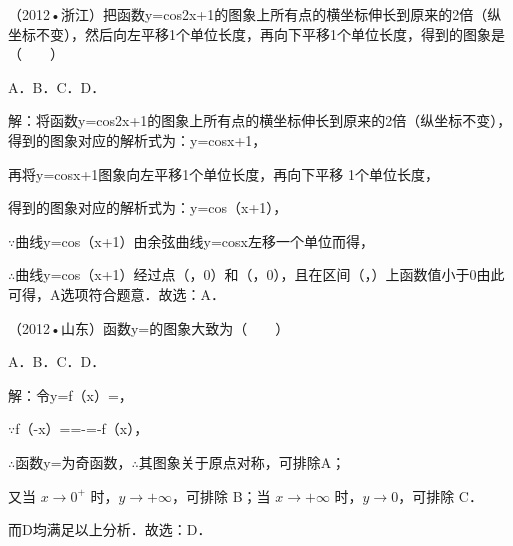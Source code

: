 \begin{question}
（2012•浙江）把函数y=cos2x+1的图象上所有点的横坐标伸长到原来的2倍（纵坐标不变），然后向左平移1个单位长度，再向下平移1个单位长度，得到的图象是（　　）\par
A．\qquad{}B．\qquad{}C．\qquad{}D．\par
\begin{solution}
解：将函数y=cos2x+1的图象上所有点的横坐标伸长到原来的2倍（纵坐标不变），得到的图象对应的解析式为：y=cosx+1，\par
再将y=cosx+1图象向左平移1个单位长度，再向下平移 1个单位长度，\par
得到的图象对应的解析式为：y=cos（x+1），\par
\ensuremath{\because}曲线y=cos（x+1）由余弦曲线y=cosx左移一个单位而得，\par
\ensuremath{\therefore}曲线y=cos（x+1）经过点（，0）和（，0），且在区间（，）上函数值小于0由此可得，A选项符合题意．故选：A．\par
\end{solution}
\end{question}

\begin{question}
（2012•山东）函数y=的图象大致为（　　）\par
A．\qquad{}B．\qquad{}C．\qquad{}D．\par
\begin{solution}
解：令y=f（x）=，\par
\ensuremath{\because}f（-x）==-=-f（x），\par
\ensuremath{\therefore}函数y=为奇函数，\ensuremath{\therefore}其图象关于原点对称，可排除A；\par
又当 $x\to0^+$ 时，$y\to+\infty$，可排除 B；当 $x\to+\infty$ 时，$y\to0$，可排除 C．\par
而D均满足以上分析．故选：D．\par
\end{solution}
\end{question}

